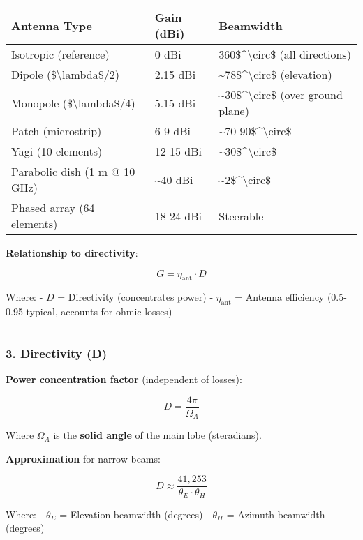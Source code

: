 {\def\LTcaptype{} %
\begin{longtable}[]{@{}lll@{}}
\toprule\noalign{}
Antenna Type & Gain (dBi) & Beamwidth \\
\midrule\noalign{}
\endhead
\bottomrule\noalign{}
\endlastfoot
Isotropic (reference) & 0 dBi & 360\$\^{}\textbackslash circ\$ (all
directions) \\
Dipole (\$\textbackslash lambda\$/2) & 2.15 dBi &
\textasciitilde78\$\^{}\textbackslash circ\$ (elevation) \\
Monopole (\$\textbackslash lambda\$/4) & 5.15 dBi &
\textasciitilde30\$\^{}\textbackslash circ\$ (over ground plane) \\
Patch (microstrip) & 6-9 dBi &
\textasciitilde70-90\$\^{}\textbackslash circ\$ \\
Yagi (10 elements) & 12-15 dBi &
\textasciitilde30\$\^{}\textbackslash circ\$ \\
Parabolic dish (1 m @ 10 GHz) & \textasciitilde40 dBi &
\textasciitilde2\$\^{}\textbackslash circ\$ \\
Phased array (64 elements) & 18-24 dBi & Steerable \\
\end{longtable}
}

\textbf{Relationship to directivity}:

\[
G = \eta_{\text{ant}} \cdot D
\]

Where: - \(D\) = Directivity (concentrates power) -
\(\eta_{\text{ant}}\) = Antenna efficiency (0.5-0.95 typical, accounts
for ohmic losses)

\begin{center}\rule{0.5\linewidth}{0.5pt}\end{center}

\subsubsection{3. Directivity (D)}\label{directivity-d}

\textbf{Power concentration factor} (independent of losses):

\[
D = \frac{4\pi}{\Omega_A}
\]

Where \(\Omega_A\) is the \textbf{solid angle} of the main lobe
(steradians).

\textbf{Approximation} for narrow beams:

\[
D \approx \frac{41,253}{\theta_E \cdot \theta_H}
\]

Where: - \(\theta_E\) = Elevation beamwidth (degrees) - \(\theta_H\) =
Azimuth beamwidth (degrees)

